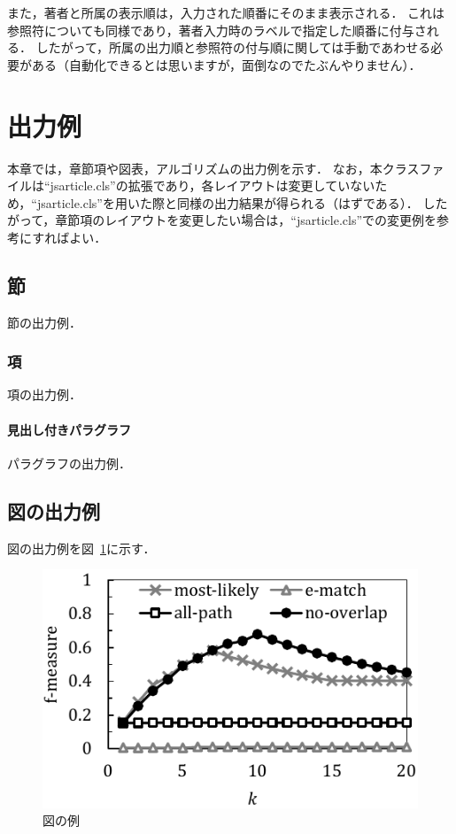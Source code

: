 \documentclass[lualatex]{ipsj}
\newcommand{\Fig}[1]{図~#1}
\begin{document}
また，著者と所属の表示順は，入力された順番にそのまま表示される．
これは参照符についても同様であり，著者入力時のラベルで指定した順番に付与される．
したがって，所属の出力順と参照符の付与順に関しては手動であわせる必要がある（自動化できるとは思いますが，面倒なのでたぶんやりません）．


\section{出力例}
本章では，章節項や図表，アルゴリズムの出力例を示す．
なお，本クラスファイルは``jsarticle.cls''の拡張であり，各レイアウトは変更していないため，``jsarticle.cls''を用いた際と同様の出力結果が得られる（はずである）．
したがって，章節項のレイアウトを変更したい場合は，``jsarticle.cls''での変更例を参考にすればよい．

  \subsection{節}
  節の出力例．

    \subsubsection{項}
    項の出力例．

      \paragraph{見出し付きパラグラフ}
      パラグラフの出力例．
  
  \subsection{図の出力例}
  図の出力例を\Fig{\ref{fig:sample}}に示す．
  
    \begin{figure}[t]
    \centering
    \includegraphics[scale=0.8]{./figures/sample_graph.pdf}
    \caption{図の例}
    \label{fig:sample}
    \end{figure}
  
\end{document}

